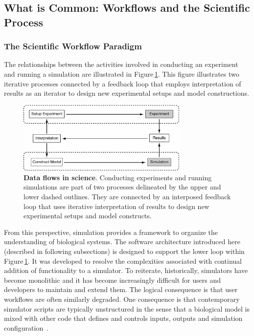 \documentclass[10pt,letterpaper]{article}
\begin{document}
\subsection*{What is Common: Workflows and the Scientific Process}

\subsubsection*{The Scientific Workflow Paradigm}

The relationships between the activities involved in conducting an experiment and running a simulation are illustrated in Figure\,\ref{fig3}.  This figure illustrates two iterative processes connected by a feedback loop that employs interpretation of results as an iterator to design new experimental setups and model constructions.

\begin{figure}[h!t]
  \begin{center}
    \includegraphics[width=0.75\textwidth]{figures/exp-sim.pdf}
  \end{center}
  \caption{ \small{\textbf{Data flows in science}. Conducting experiments and running simulations are part of two processes delineated by the upper and lower dashed outlines. They are connected by an interposed feedback loop that uses iterative interpretation of results to design new experimental setups and model constructs.}}
    \label{fig3}
\end{figure}

From this perspective, simulation provides a framework to organize the understanding of biological systems. The software architecture introduced here (described in following subsections) is designed to support the lower loop within Figure\,\ref{fig3}. It was developed to resolve the complexities associated with continual addition of functionality to a simulator. To reiterate, historically, simulators have become monolithic and it has become increasingly difficult for users and developers to maintain and extend them. The logical consequence is that user workflows are often similarly degraded. One consequence is that contemporary simulator scripts are typically unstructured in the sense that a biological model is mixed with other code that defines and controls inputs, outputs and simulation configuration~\cite{cannon07:_inter}.
\end{document}
